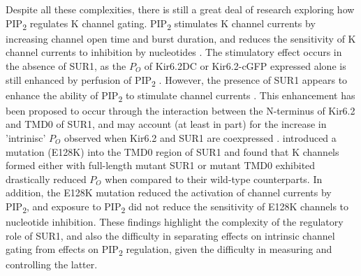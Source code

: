 Despite all these complexities, there is still a great deal of research exploring how PIP\textsubscript{2} regulates K\ATP{} channel gating.
PIP\textsubscript{2} stimulates K\ATP{} channel currents by increasing channel open time and burst duration, and reduces the sensitivity of K\ATP{} channel currents to inhibition by nucleotides \cite{fan_phosphoinositides_1999, baukrowitz_pip2_1998, shyng_membrane_1998, fan_phosphoinositides_1999, enkvetchakul_kinetic_2000}.
The stimulatory effect occurs in the absence of SUR1, as the $P_O$ of Kir6.2\textgreek{D}C or Kir6.2-cGFP expressed alone is still enhanced by perfusion of PIP\textsubscript{2} \cite{fan_phosphoinositides_1999, enkvetchakul_kinetic_2000}.
However, the presence of SUR1 appears to enhance the ability of PIP\textsubscript{2} to stimulate channel currents \cite{baukrowitz_pip2_1998, shyng_membrane_1998, fan_phosphoinositides_1999, enkvetchakul_kinetic_2000}.
This enhancement has been proposed to occur through the interaction between the N-terminus of Kir6.2 and TMD0 of SUR1, and may account (at least in part) for the increase in 'intrinisc' $P_O$ observed when Kir6.2 and SUR1 are coexpressed \cite{pratt_n-terminal_2011}.
\citeauthor{pratt_n-terminal_2011} introduced a mutation (E128K) into the TMD0 region of SUR1 and found that K\ATP{} channels formed either with full-length mutant SUR1 or mutant TMD0 exhibited drastically reduced $P_O$ when compared to their wild-type counterparts.
In addition, the E128K mutation reduced the activation of channel currents by PIP\textsubscript{2}, and exposure to PIP\textsubscript{2} did not reduce the sensitivity of E128K channels to nucleotide inhibition.
These findings highlight the complexity of the regulatory role of SUR1, and also the difficulty in separating effects on intrinsic channel gating from effects on PIP\textsubscript{2} regulation, given the difficulty in measuring and controlling the latter.

